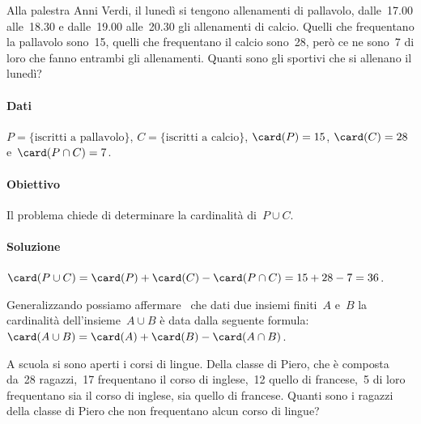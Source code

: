 {\begin{exrig}
\begin{esempio}
% 
\end{esempio}
\begin{esempio}
\begin{multicols}{2}
 Alla palestra Anni Verdi, il lunedì si tengono allenamenti di pallavolo, 
 dalle~17.00 alle~18.30 e dalle~19.00 alle~20.30 gli allenamenti di calcio. 
 Quelli che frequentano la pallavolo sono~15, quelli che frequentano il calcio 
 sono~28, però ce ne sono~7 di loro che fanno entrambi gli allenamenti. 
 Quanti sono gli sportivi che si allenano il lunedì?
\begin{center}
 
 \end{center}
\end{multicols}

\paragraph{Dati} $P=\{\text{iscritti a pallavolo}\}$, 
 $C=\{\text{iscritti a calcio}\}$, $\card(P)=15$, 
 $\card(C)=28$ e~$\card(P\cap C)=7$.
 
\paragraph{Obiettivo} Il problema chiede di determinare la cardinalità 
di~$P\cup C$.

\paragraph{Soluzione} 
 $\card(P\cup C)=\card(P)+\card(C)-\card(P\cap C)=15+28-7=36$.

Generalizzando possiamo affermare \ che dati due insiemi finiti~$A$ e~$B$ 
la cardinalità dell'insieme~$A\cup B$ è data dalla seguente formula:
$\card(A\cup B)=\card(A)+\card(B)-\card(A\cap B)$.
\end{esempio}

\begin{esempio}
 A scuola si sono aperti i corsi di lingue. Della classe di Piero, che è 
 composta da~28 ragazzi,~17 frequentano il corso di inglese,~12
quello di francese,~5 di loro frequentano sia il corso di inglese, sia quello 
di francese. Quanti sono i ragazzi della classe di Piero che non
frequentano alcun corso di lingue?


\end{esempio}
\end{exrig}}
